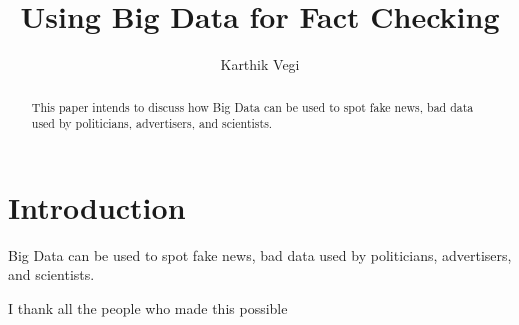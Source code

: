 \documentclass[sigconf]{acmart}
\begin{document}
\title{Using Big Data for Fact Checking}

\author{Karthik Vegi}

\renewcommand{\shortauthors}{K. Vegi}


\begin{abstract}
This paper intends to discuss how Big Data can be used to spot fake news, bad data used by politicians, advertisers, and scientists.
\end{abstract}



\maketitle

\section{Introduction}

Big Data can be used to spot fake news, bad data used by politicians, advertisers, and scientists.

\begin{acks}

  I thank all the people who made this possible

\end{acks}
\end{document}
